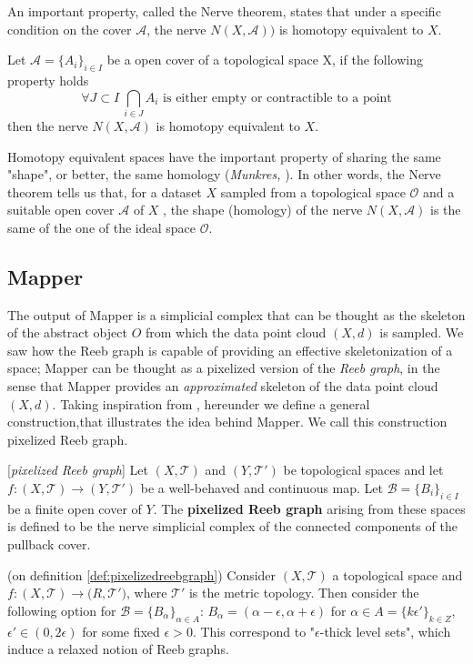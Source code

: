 An important property, called the Nerve theorem, states that under a specific condition on the cover $\mathcal A$, the nerve $N(X, \mathcal A))$ is homotopy equivalent to $X$.

\begin{prop}
	Let $\mathcal A =\{A_i\}_{i\in I}$ be a open cover of a topological space X, if the following property holds
	$$\forall J\subset I \ \bigcap\limits_{i\in J} A_i \text{ is either empty or contractible to a point}$$
	then the nerve $N(X,\mathcal{A})$ is homotopy equivalent to $X$.
\end{prop}

Homotopy equivalent spaces have the important property of sharing the same "shape", or better, the same homology (\textit{Munkres, }\cite{Munkres}). In other words, the Nerve theorem tells us that, for a dataset $X$ sampled from a topological space $\mathcal O$ and a suitable open cover $\mathcal A$ of $X$ , the shape (homology) of the nerve $N(X,\mathcal A)$ is the same of the one of the ideal space $\mathcal O$.



\subsection{Mapper}
\label{sec:mapper}
The output of Mapper is a simplicial complex that can be thought as the skeleton of the abstract object $O$ from which the data point cloud $(X,d)$ is sampled. We saw how the Reeb graph is capable of providing an effective skeletonization of a space; Mapper can be thought as a pixelized version of the \textit{Reeb graph}, in the sense that Mapper provides an \textit{approximated} skeleton of the data point cloud $(X,d)$. Taking inspiration from \cite{multiscaleMapper}, hereunder we define a general construction,that illustrates the idea behind Mapper. We call this construction pixelized Reeb graph.
\begin{definition}{[\textit{pixelized Reeb graph}]}
	Let $(X,\mathcal{T})$ and $(Y,\mathcal{T}')$ be topological spaces and let $f : (X,\mathcal{T}) \rightarrow (Y,\mathcal{T}')$ be a well-behaved and continuous map. Let $\mathcal{B}=\{B_i\}_{i\in I}$ be a finite open cover of $Y$. The \textbf{pixelized Reeb graph} arising from these spaces is defined to be the nerve simplicial complex of the connected components of the pullback cover.
	\label{def:pixelizedreebgraph}
\end{definition}
\begin{remark}{(on definition \ref{def:pixelizedreebgraph})}
	Consider $(X,\mathcal{T})$ a topological space and $f:(X,\mathcal{T})\rightarrow\mathbb({R},\mathcal{T}')$, where $\mathcal{T}'$ is the metric topology. Then consider the following option for $\mathcal{B}=\{B_{\alpha}\}_{\alpha\in A}$: $B_\alpha = (\alpha-\epsilon,\alpha+\epsilon)$ for $\alpha\in A=\{k\epsilon'\}_{k\in Z}$, $\epsilon'\in(0,2\epsilon)$ for some fixed $\epsilon>0$. This correspond to "$\epsilon$-thick level sets", which induce a relaxed notion of Reeb graphs.
\end{remark}

